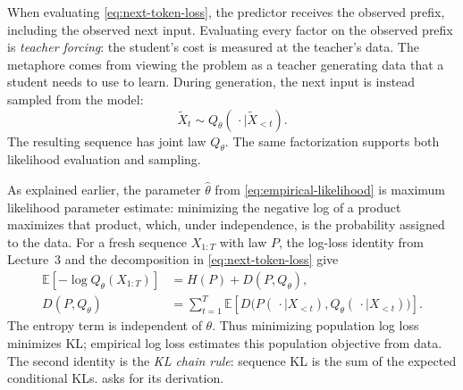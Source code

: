 \documentclass[11pt,twoside]{article}
\newcommand{\E}{\mathbb E}
\newcommand{\KL}{D}
\theoremstyle{definition}
\theoremstyle{remark}
\begin{document}
When evaluating \cref{eq:next-token-loss}, the predictor receives the
observed prefix, including the observed next input.
Evaluating every factor on the observed prefix is \emph{teacher forcing}:
the student's cost is measured at the
teacher's data. The metaphore comes from viewing the problem as a teacher generating
data that a student needs to use to learn.
During generation, the
next input is instead sampled from the model:
\begin{equation}
  \widetilde X_t\sim
  Q_\theta(\,\cdot\mid\widetilde X_{<t}).
  \label{eq:generation}
\end{equation}
The resulting sequence has joint law \(Q_\theta\). The same factorization
supports both likelihood evaluation and sampling.


As explained earlier,
the parameter $\widehat \theta$ from
\cref{eq:empirical-likelihood} is
maximum likelihood parameter estimate:
minimizing the negative log of a product
maximizes that product, which, under independence, is the probability assigned to the data.
For a fresh sequence \(X_{1:T}\) with law \(P\),
the log-loss identity from Lecture~3 and the decomposition in
\cref{eq:next-token-loss} give
\begin{equation}
  \begin{aligned}
  \E[-\log Q_\theta(X_{1:T})]
  &=H(P)+\KL(P, Q_\theta),\\
  \KL(P, Q_\theta)
  &=\sum_{t=1}^T\E\!\left[
    \KL\bigl(P(\,\cdot\mid X_{<t})
       , Q_\theta(\,\cdot\mid X_{<t})\bigr)\right].
  \end{aligned}
  \label{eq:population-kl}
\end{equation}
The entropy term is independent of \(\theta\). Thus minimizing population
log loss minimizes KL; empirical log loss estimates this population
objective from data.
The second identity is the \emph{KL chain rule}: sequence KL is the
sum of the expected conditional KLs.  asks for its
derivation.
\end{document}
